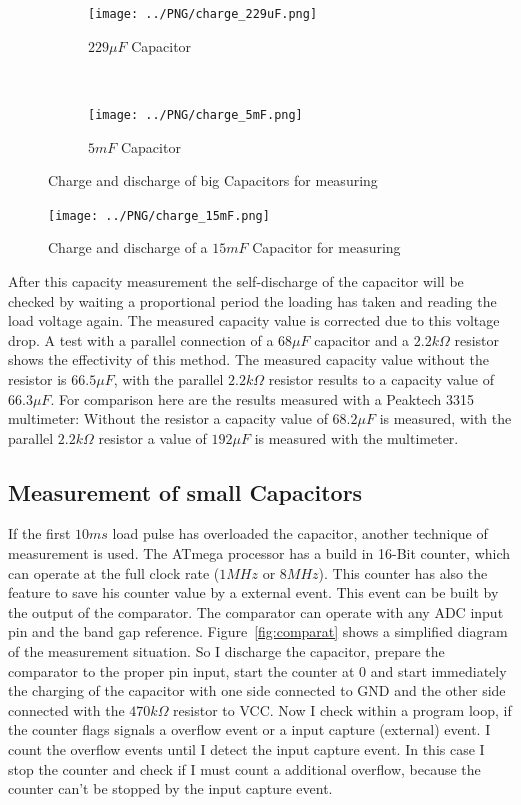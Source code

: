 \begin{figure}[H]
  \begin{subfigure}[b]{.5\textwidth}
    \centering
    \texttt{[image: ../PNG/charge\_229uF.png]}
    \caption{\(229\mu F\) Capacitor}
    \label{pic:c229}
  \end{subfigure}
  ~
  \begin{subfigure}[b]{.5\textwidth}
    \centering
    \texttt{[image: ../PNG/charge\_5mF.png]}
    \caption{\(5mF\) Capacitor}
    \label{pic:c5mF}
  \end{subfigure}
  \caption{Charge and discharge of big Capacitors for measuring}
\end{figure}

\begin{figure}[H]
  \centering
    \texttt{[image: ../PNG/charge\_15mF.png]}
  \caption{Charge and discharge of a \(15mF\) Capacitor for measuring}
  \label{pic:c15mF}
\end{figure}

After this capacity measurement the self-discharge of the capacitor will be checked by
waiting a proportional period the loading has taken and reading the load voltage again.
The measured capacity value is corrected due to this voltage drop.
A test with a parallel connection of a \(68\mu F\) capacitor and a \(2.2k\Omega\) resistor shows
the effectivity of this method.
The measured capacity value without the resistor is \(66.5\mu F\),
with the parallel \(2.2k\Omega\) resistor results to a capacity value of \(66.3\mu F\).
For comparison here are the results measured with a Peaktech 3315 multimeter:
Without the resistor a capacity value of \(68.2\mu F\) is measured, with the
parallel \(2.2k\Omega\) resistor a value of \(192\mu F\) is measured with the multimeter.


\subsection{Measurement of small Capacitors}
If the first \(10ms\) load pulse has overloaded the capacitor, another technique of measurement is used.
The ATmega processor has a build in 16-Bit counter, which can operate at the full clock rate (\(1MHz\) or \(8MHz\)).
This counter has also the feature to save his counter value by a external event.
This event can be built by the output of the comparator. 
The comparator can operate with any ADC input pin and the band gap reference.
Figure~\ref{fig:comparat} shows a simplified diagram of the measurement situation.
So I discharge the capacitor, prepare the comparator to the proper pin input, start the counter at 0 and
start immediately the charging of the capacitor with one side connected to GND and the other side connected with
the \(470k\Omega\) resistor to VCC.
Now I check within a program loop, if the counter flags signals a overflow event or a input capture (external) event.
I count the overflow events until I detect the input capture event.
In this case I stop the counter and check if I must count a additional overflow,
because the counter can't be stopped by the input capture event.


